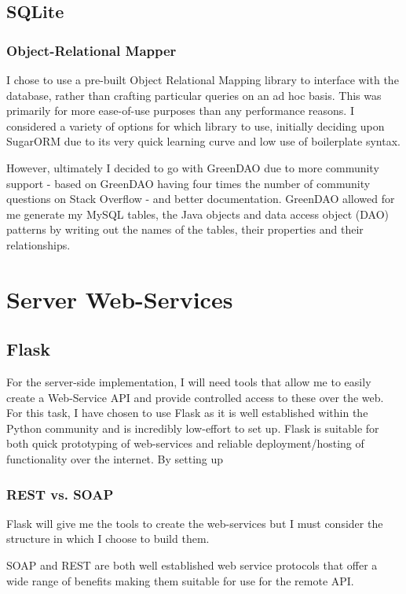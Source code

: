 \subsection{SQLite}

\subsubsection{Object-Relational Mapper}
I chose to use a pre-built Object Relational Mapping library to interface with the database, rather than crafting particular queries on an ad hoc basis.
This was primarily for more ease-of-use purposes than any performance reasons. 
I considered a variety of options for which library to use, initially deciding upon SugarORM due to its very quick learning curve and low use of boilerplate syntax. 

However, ultimately I decided to go with GreenDAO due to more community support - based on GreenDAO having four times the number of community questions on Stack Overflow - and better documentation.
GreenDAO allowed for me generate my MySQL tables, the Java objects and data access object (DAO) patterns by writing out the names of the tables, their properties and their relationships. 

\section{Server Web-Services}
\subsection{Flask}
For the server-side implementation, I will need tools that allow me to easily create a Web-Service API and provide controlled access to these over the web.
For this task, I have chosen to use Flask as it is well established within the Python community and is incredibly low-effort to set up. 
Flask is suitable for both quick prototyping of web-services and reliable deployment/hosting of functionality over the internet.
By setting up 

\subsubsection{REST vs. SOAP}
Flask will give me the tools to create the web-services but I must consider the structure in which I choose to build them. 

SOAP and REST are both well established web service protocols that offer a wide range of benefits making them suitable for use for the remote API.


